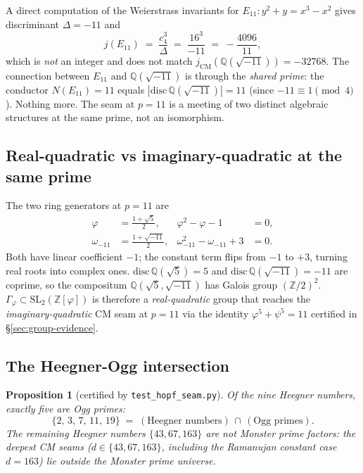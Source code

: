\documentclass[11pt,a4paper]{article}
\theoremstyle{plain}
\newtheorem{proposition}[theorem]{Proposition}
\theoremstyle{definition}
\theoremstyle{remark}
\numberwithin{equation}{section}
\providecommand{\Zp}{\ensuremath{\mathbb{Z}[\varphi]}}
\providecommand{\Gphi}{\ensuremath{\Gamma_{\varphi}}}
\begin{document}
A direct computation of the Weierstrass invariants for $E_{11}: y^{2}+y=x^{3}-x^{2}$
gives discriminant $\Delta=-11$ and
\[
  j(E_{11}) \;=\; \frac{c_{4}^{3}}{\Delta} \;=\; \frac{16^{3}}{-11} \;=\; -\frac{4096}{11},
\]
which is \emph{not} an integer and does not match $j_{\mathrm{CM}}(\mathbb{Q}(\sqrt{-11}))=-32768$.
The connection between $E_{11}$ and $\mathbb{Q}(\sqrt{-11})$ is through the
\emph{shared prime}: the conductor $N(E_{11})=11$ equals $|\mathrm{disc}\,\mathbb{Q}(\sqrt{-11})|=11$
(since $-11\equiv 1\pmod{4}$).  Nothing more.  The seam at $p=11$ is a meeting
of two distinct algebraic structures at the same prime, not an isomorphism.

\subsection*{Real-quadratic vs imaginary-quadratic at the same prime}

The two ring generators at $p=11$ are
\begin{align}
  \varphi      &= \tfrac{1+\sqrt{5}}{2},        & \varphi^{2}-\varphi-1 &= 0, \\
  \omega_{-11} &= \tfrac{1+\sqrt{-11}}{2},      & \omega_{-11}^{2}-\omega_{-11}+3 &= 0.
\end{align}
Both have linear coefficient $-1$; the constant term flips from $-1$ to $+3$,
turning real roots into complex ones.  $\mathrm{disc}\,\mathbb{Q}(\sqrt{5})=5$
and $\mathrm{disc}\,\mathbb{Q}(\sqrt{-11})=-11$ are coprime, so the compositum
$\mathbb{Q}(\sqrt{5},\sqrt{-11})$ has Galois group $(\mathbb{Z}/2)^{2}$.
$\Gphi\subset\mathrm{SL}_2(\Zp)$ is therefore a \emph{real-quadratic}
group that reaches the \emph{imaginary-quadratic} CM seam at $p=11$ via the
identity $\varphi^{5}+\psi^{5}=11$ certified in \S\ref{sec:group-evidence}.

\subsection*{The Heegner-Ogg intersection}

\begin{proposition}[certified by \texttt{test\_hopf\_seam.py}]\label{prop:heegner-ogg}
  Of the nine Heegner numbers, exactly five are Ogg primes:
  \[
    \{2,\,3,\,7,\,11,\,19\} \;=\; (\text{Heegner numbers}) \,\cap\, (\text{Ogg primes}).
  \]
  The remaining Heegner numbers $\{43, 67, 163\}$ are \emph{not} Monster prime
  factors: the deepest CM seams ($d\in\{43,67,163\}$, including the Ramanujan
  constant case $d=163$) lie outside the Monster prime universe.
\end{proposition}
\end{document}
